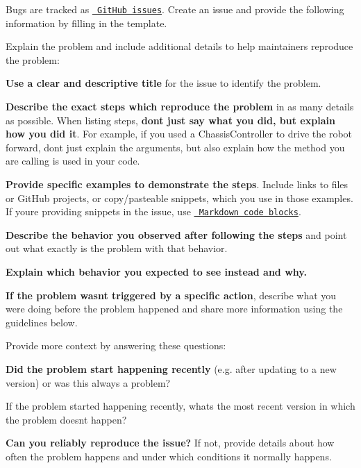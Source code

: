 Bugs are tracked as \href{https://guides.github.com/features/issues/}{\texttt{ Git\+Hub issues}}. Create an issue and provide the following information by filling in the template.

Explain the problem and include additional details to help maintainers reproduce the problem\+:


\begin{DoxyItemize}
\item {\bfseries{Use a clear and descriptive title}} for the issue to identify the problem.
\item {\bfseries{Describe the exact steps which reproduce the problem}} in as many details as possible. When listing steps, {\bfseries{don\textquotesingle{}t just say what you did, but explain how you did it}}. For example, if you used a {\ttfamily Chassis\+Controller} to drive the robot forward, don\textquotesingle{}t just explain the arguments, but also explain how the method you are calling is used in your code.
\item {\bfseries{Provide specific examples to demonstrate the steps}}. Include links to files or Git\+Hub projects, or copy/pasteable snippets, which you use in those examples. If you\textquotesingle{}re providing snippets in the issue, use \href{https://github.com/adam-p/markdown-here/wiki/Markdown-Cheatsheet\#code}{\texttt{ Markdown code blocks}}.
\item {\bfseries{Describe the behavior you observed after following the steps}} and point out what exactly is the problem with that behavior.
\item {\bfseries{Explain which behavior you expected to see instead and why.}}
\item {\bfseries{If the problem wasn\textquotesingle{}t triggered by a specific action}}, describe what you were doing before the problem happened and share more information using the guidelines below.
\end{DoxyItemize}

Provide more context by answering these questions\+:


\begin{DoxyItemize}
\item {\bfseries{Did the problem start happening recently}} (e.\+g. after updating to a new version) or was this always a problem?
\item If the problem started happening recently, what\textquotesingle{}s the most recent version in which the problem doesn\textquotesingle{}t happen?
\item {\bfseries{Can you reliably reproduce the issue?}} If not, provide details about how often the problem happens and under which conditions it normally happens.
\end{DoxyItemize}

